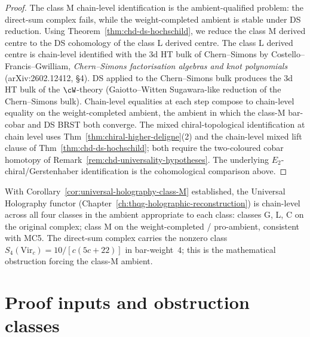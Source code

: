 \begin{proof}
The class M chain-level identification is the ambient-qualified
problem: the direct-sum complex fails, while the weight-completed
ambient is stable under DS reduction. Using
Theorem~\ref{thm:chd-ds-hochschild}, we reduce the class M derived
centre to the DS cohomology of the class L derived centre.
The class L derived centre is chain-level identified with the 3d HT
bulk of Chern--Simons by Costello--Francis--Gwilliam,
\emph{Chern--Simons factorisation algebras and knot polynomials}
(arXiv:2602.12412, \S4). DS applied to the Chern--Simons bulk
produces the 3d HT bulk of the $\cW$-theory (Gaiotto--Witten
Sugawara-like reduction of the Chern--Simons bulk). Chain-level
equalities at each step compose to chain-level equality on the
weight-completed ambient, the ambient in which the class-M
bar-cobar and DS BRST both converge. The mixed chiral-topological
identification at chain level uses
Thm~\ref{thm:chiral-higher-deligne}(2) and the chain-level mixed lift
clause of Thm~\ref{thm:chd-ds-hochschild}; both require the
two-coloured cobar homotopy of
Remark~\ref{rem:chd-universality-hypotheses}. The underlying
$E_2$-chiral/Gerstenhaber identification is the cohomological
comparison above.
\end{proof}

\begin{remark}%
\label{rem:chd-vol2-part-vi}%
With Corollary~\ref{cor:universal-holography-class-M} established, the
Universal Holography functor
(Chapter~\ref{ch:thqg-holographic-reconstruction}) is chain-level
across all four classes in the ambient appropriate to each class:
classes G, L, C on the original complex; class M on the
weight-completed / pro-ambient, consistent with MC5. The
direct-sum complex carries the nonzero class
$S_4(\mathrm{Vir}_c)=10/[c(5c+22)]$ in bar-weight~$4$; this is the
mathematical obstruction forcing the class-M ambient.
\end{remark}

\section{Proof inputs and obstruction classes}
\label{sec:chd-proof-inputs}

